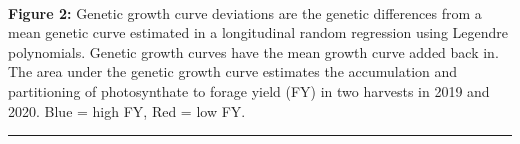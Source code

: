 \documentclass[10pt, letterpaper]{article}
\begin{document}
\\
\textbf{Figure 2:} Genetic growth curve deviations are the genetic differences from a mean genetic curve estimated in a longitudinal random regression using Legendre polynomials. Genetic growth curves have the mean growth curve added back in. The area under the genetic growth curve estimates the accumulation and partitioning of photosynthate to forage yield (FY) in two harvests in 2019 and 2020. Blue = high FY, Red = low FY.

\medskip

\noindent \rule{\linewidth}{0.1pt}

\medskip
\end{document}
